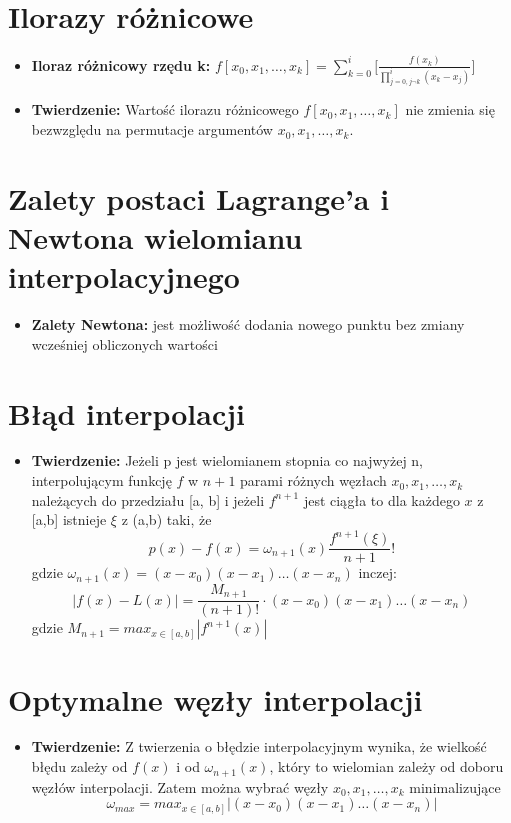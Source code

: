 \documentclass[11pt]{article}
\begin{document}
\section{Ilorazy różnicowe}
\begin{itemize}
    \item \textbf{Iloraz różnicowy rzędu k: }\quad $f[x_0,x_1,\dots,x_k] = \sum_{k=0}^i \bigg[\frac{f(x_k)}{\prod_{j=0,j \neg k}^i(x_k - x_j)}\bigg]$
    \item \textbf{Twierdzenie: }Wartość ilorazu różnicowego $f[x_0,x_1,\dots,x_k]$ nie zmienia się bezwzględu na permutacje argumentów $x_0,x_1,\dots,x_k$.
\end{itemize}

\section{Zalety postaci Lagrange’a i Newtona wielomianu interpolacyjnego}
\begin{itemize}
    \item \textbf{Zalety Newtona: } jest możliwość dodania nowego punktu bez zmiany wcześniej obliczonych wartości
\end{itemize}

\section{Błąd interpolacji}
\begin{itemize}
    \item \textbf{Twierdzenie: }Jeżeli p jest wielomianem stopnia co najwyżej n, interpolującym funkcję $f$ w $n+1$ parami różnych węzłach  $x_0,x_1,\dots,x_k$ 
    należących do przedziału [a, b] i jeżeli $f^{n+1}$ jest ciągła to dla każdego $x$ z [a,b] istnieje $\xi$ z (a,b) taki, że
    \[p(x) - f(x) = \omega_{n+1}(x) \frac{f^{n+1}(\xi)}{n+1}!\]
    gdzie $\omega_{n+1}(x) = (x-x_0)(x-x_1)\dots(x-x_n)$ inczej:
    \[|f(x) - L(x)| = \frac{M_{n+1}}{(n+1)!}\cdot (x-x_0)(x-x_1)\dots(x-x_n)\]
    gdzie $M_{n+1} = max_{x \in [a,b]}|f^{n+1}(x)|$
\end{itemize}

\section{Optymalne węzły interpolacji}
\begin{itemize}
    \item \textbf{Twierdzenie: }Z twierzenia o błędzie interpolacyjnym wynika, że wielkość błędu zależy od $f(x)$ i od $\omega_{n+1}(x)$, który to wielomian zależy
    od doboru węzłów interpolacji. Zatem można wybrać węzły $x_0,x_1,\dots,x_k$ minimalizujące 
    \[\omega_{max} = max_{x \in [a,b]}|(x-x_0)(x-x_1)\dots(x-x_n)|\]
\end{itemize}
\end{document}
